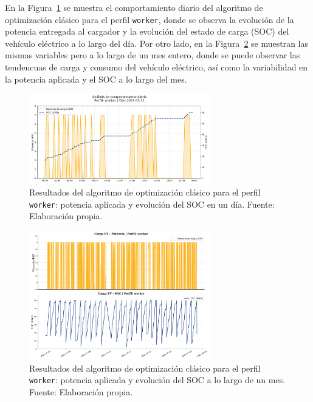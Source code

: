 En la Figura~\ref{fig: classic_daily_profiles} se muestra el comportamiento diario del algoritmo de
optimización clásico para el perfil \texttt{worker}, donde se observa la evolución de la potencia
entregada al cargador y la evolución del estado de carga (SOC) del vehículo eléctrico a lo largo 
del día. Por otro lado, en la Figura~\ref{fig: classic_global_profiles} se muestran las mismas 
variables pero a lo largo de un mes entero, donde se puede observar las tendencuas de carga y
consumo del vehículo eléctrico, así como la variabilidad en la potencia aplicada y el SOC a lo largo
del mes.
\begin{figure}[H]
    \centering
    \includegraphics[width=0.7\textwidth]{images/classic/daily_behavior_2021-03-21_worker.png}
    \caption{Resultados del algoritmo de optimización clásico para el perfil \texttt{worker}: 
    potencia aplicada y evolución del SOC en un día. Fuente: Elaboración propia.}
    \label{fig: classic_daily_profiles}
\end{figure}
\begin{figure}[H]
    \centering
    \includegraphics[width=0.7\textwidth]{images/classic/global_july_classic_worker.png}
    \caption{Resultados del algoritmo de optimización clásico para el perfil \texttt{worker}: 
    potencia aplicada y evolución del SOC a lo largo de un mes. Fuente: Elaboración propia.}
    \label{fig: classic_global_profiles}
\end{figure}

